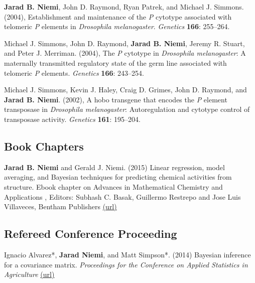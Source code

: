 \documentclass[overlapped,line]{res}
\begin{document}
\begin{resume}
{\bf Jarad B. Niemi}, John D. Raymond, Ryan Patrek, and Michael J. Simmons. (2004), Establishment and maintenance of the \emph{P} cytotype associated with telomeric \emph{P} elements in \emph{Drosophila melanogaster}. \emph{Genetics} {\bf 166}: 255--264.

Michael J. Simmons, John D. Raymond, {\bf Jarad B. Niemi}, Jeremy R. Stuart, and Peter J. Merriman. (2004), The \emph{P} cytotype in \emph{Drosophila melanogaster}: A maternally transmitted regulatory state of the germ line associated with telomeric \emph{P} elements. \emph{Genetics} {\bf 166}: 243--254.


Michael J. Simmons, Kevin J. Haley, Craig D. Grimes, John D. Raymond, and {\bf Jarad B. Niemi}. (2002), A hobo transgene that encodes the \emph{P} element transposase in \emph{Drosophila melanogaster}: Autoregulation and cytotype control of transposase activity. \emph{Genetics} {\bf 161}: 195--204.





\subsection{\bf Book Chapters}

{\bf Jarad B. Niemi} and Gerald J. Niemi. (2015) Linear regression, model averaging, and Bayesian techniques for predicting chemical activities from structure. Ebook chapter on Advances in Mathematical Chemistry and Applications
, Editors: Subhash C. Basak, Guillermo Restrepo and Jose Luis Villaveces, Bentham Publishers \href{http://www.eurekaselect.com/132675/chapter/linear-regression%2C-model-averaging%2C-and-bayesian-techniques-for-predicting-chemical-activities-from-structur}{(url)}


\subsection{\bf Refereed Conference Proceeding}

Ignacio Alvarez*, {\bf Jarad Niemi}, and Matt Simpson*. (2014) Bayesian inference for a covariance matrix. \emph{Proceedings for the Conference on Applied Statistics in Agriculture} \href{http://newprairiepress.org/agstatconference/2014/proceedings/8/}{(url)}


\end{resume}
\end{document}
